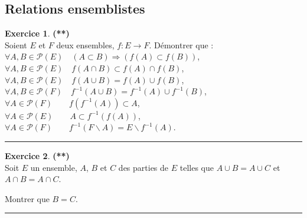 \documentclass[a4paper,11pt]{article}
\theoremstyle{definition}
\newtheorem{exo}{Exercice} %
\begin{document}
\begin{minipage}{1\linewidth}
\begin{minipage}[t]{0.48\linewidth}
\subsection*{Relations ensemblistes}
\begin{exo}\textbf{(**)}\quad\\[0.2cm]
	Soient $E$ et $F$ deux ensembles, $f:E\rightarrow F$. D\'emontrer que :\\
	$\forall A,B \in \mathcal{P}(E) \quad (A\subset B)\Rightarrow (f(A)\subset f(B))$,\\
	$\forall A,B \in \mathcal{P}(E) \quad f(A\cap B)\subset f(A)\cap f(B)$,\\
	$\forall A,B \in \mathcal{P}(E) \quad f(A\cup B) = f(A)\cup f(B)$,\\
	$\forall A,B \in \mathcal{P}(F) \quad f^{-1}(A\cup B) = f^{-1}(A)\cup f^{-1}(B)$,\\
	$\forall A \in \mathcal{P}(F) \quad \quad f(f^{-1}(A)) \subset A $,\\
	$\forall A \in \mathcal{P}(E) \quad \quad A \subset f^{-1}(f(A))$,\\
	$\forall A \in \mathcal{P}(F) \quad \quad f^{-1}(F\backslash A)=E\backslash f^{-1}(A)$.
	
	\centering
	\rule{1\linewidth}{0.6pt}
\end{exo}



\begin{exo}\textbf{(**)}\quad\\[0.2cm]
Soit $E$ un ensemble, $A$, $B$ et $C$ des parties de $E$ telles que $A \cup B = A \cup C$ et $A \cap B = A \cap C$. 

Montrer que $B = C$.

\centering
\rule{1\linewidth}{0.6pt}
\end{exo}	




\end{minipage}
\end{minipage}
\end{document}
